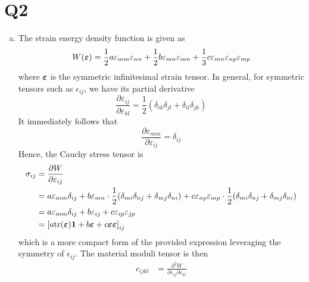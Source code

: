 \section*{Q2}
\begin{enumerate}[(a)]
\item {
    The strain energy density function is given as 
    \begin{equation}
        W(\bm{\varepsilon}) = \frac{1}{2}a \varepsilon_{mm} \varepsilon_{nn} + \frac{1}{2}b \varepsilon_{mn} \varepsilon_{mn} + \frac{1}{3}c \varepsilon_{mn}\varepsilon_{np}\varepsilon_{mp}
    \end{equation}
    where $\bm{\varepsilon}$ is the symmetric infinitesimal strain tensor.
    In general, for symmetric tensors such as $\epsilon_{ij}$, we have its partial derivative 
    \begin{equation}
        \frac{\partial \varepsilon_{ij}}{\partial \varepsilon_{kl}} = \frac{1}{2}\left(\delta_{ik}\delta_{jl} + \delta_{il} \delta_{jk} \right)
    \end{equation}
    It immediately follows that 
    \begin{equation}
        \frac{\partial \varepsilon_{mm}}{\partial \varepsilon_{ij}} = \delta_{ij}
    \end{equation}
    Hence, the Cauchy stress tensor is 
    \begin{equation}
    \begin{aligned}
        \sigma_{ij} &= \frac{\partial W}{\partial \varepsilon_{ij}} \\
        &= a \varepsilon_{mm} \delta_{ij} + b\varepsilon_{mn} \cdot \frac{1}{2}(\delta_{mi}\delta_{nj} + \delta_{mj}\delta_{ni}) + c\varepsilon_{np} \varepsilon_{mp} \cdot \frac{1}{2}(\delta_{mi}\delta_{nj} + \delta_{mj}\delta_{ni}) \\
        &= a \varepsilon_{mm} \delta_{ij} + b\varepsilon_{ij} + c\varepsilon_{ip} \varepsilon_{jp} \\
        &= {\left[a \textrm{tr}(\bm{\varepsilon})\bm{1} + b\bm{\varepsilon} + c \bm{\varepsilon}\bm{\varepsilon} \right]}_{ij}  \\
    \end{aligned}
    \end{equation}
    which is a more compact form of the provided expression leveraging the symmetry of $\epsilon_{ij}$.
    The material moduli tensor is then 
    \begin{equation}
    \begin{aligned}
        c_{ijkl} &= \frac{\partial^2 W}{\partial \varepsilon_{ij} \partial \varepsilon_{kl}} \\

\end{aligned}
\end{equation}}
\end{enumerate}
